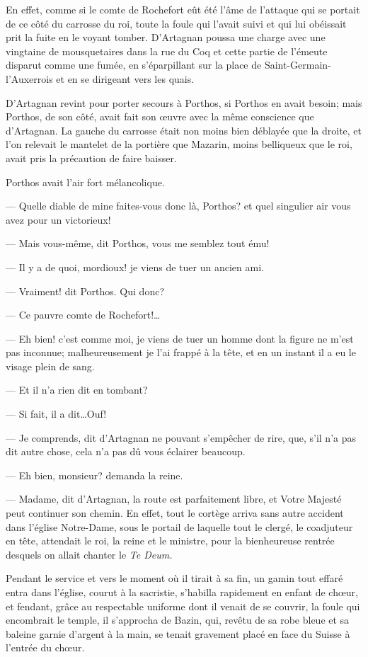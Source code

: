 En effet, comme si le comte de Rochefort eût été l'âme de l'attaque qui se portait de ce côté du carrosse du roi, toute la foule qui l'avait suivi et qui lui obéissait prit la fuite en le voyant tomber. D'Artagnan poussa une charge avec une vingtaine de mousquetaires dans la rue du Coq et cette partie de l'émeute disparut comme une fumée, en s'éparpillant sur la place de Saint-Germain-l'Auxerrois et en se dirigeant vers les quais.

D'Artagnan revint pour porter secours à Porthos, si Porthos en avait besoin; mais Porthos, de son côté, avait fait son œuvre avec la même conscience que d'Artagnan. La gauche du carrosse était non moins bien déblayée que la droite, et l'on relevait le mantelet de la portière que Mazarin, moins belliqueux que le roi, avait pris la précaution de faire baisser.

Porthos avait l'air fort mélancolique.

— Quelle diable de mine faites-vous donc là, Porthos? et quel singulier air vous avez pour un victorieux!

— Mais vous-même, dit Porthos, vous me semblez tout ému!

— Il y a de quoi, mordioux! je viens de tuer un ancien ami.

— Vraiment! dit Porthos. Qui donc?

— Ce pauvre comte de Rochefort!\dots

— Eh bien! c'est comme moi, je viens de tuer un homme dont la figure ne m'est pas inconnue; malheureusement je l'ai frappé à la tête, et en un instant il a eu le visage plein de sang.

— Et il n'a rien dit en tombant?

— Si fait, il a dit\dots Ouf!

— Je comprends, dit d'Artagnan ne pouvant s'empêcher de rire, que, s'il n'a pas dit autre chose, cela n'a pas dû vous éclairer beaucoup.

— Eh bien, monsieur? demanda la reine.

— Madame, dit d'Artagnan, la route est parfaitement libre, et Votre Majesté peut continuer son chemin.
En effet, tout le cortège arriva sans autre accident dans l'église Notre-Dame, sous le portail de laquelle tout le clergé, le coadjuteur en tête, attendait le roi, la reine et le ministre, pour la bienheureuse rentrée desquels on allait chanter le \textit{Te Deum.}

Pendant le service et vers le moment où il tirait à sa fin, un gamin tout effaré entra dans l'église, courut à la sacristie, s'habilla rapidement en enfant de chœur, et fendant, grâce au respectable uniforme dont il venait de se couvrir, la foule qui encombrait le temple, il s'approcha de Bazin, qui, revêtu de sa robe bleue et sa baleine garnie d'argent à la main, se tenait gravement placé en face du Suisse à l'entrée du chœur.

